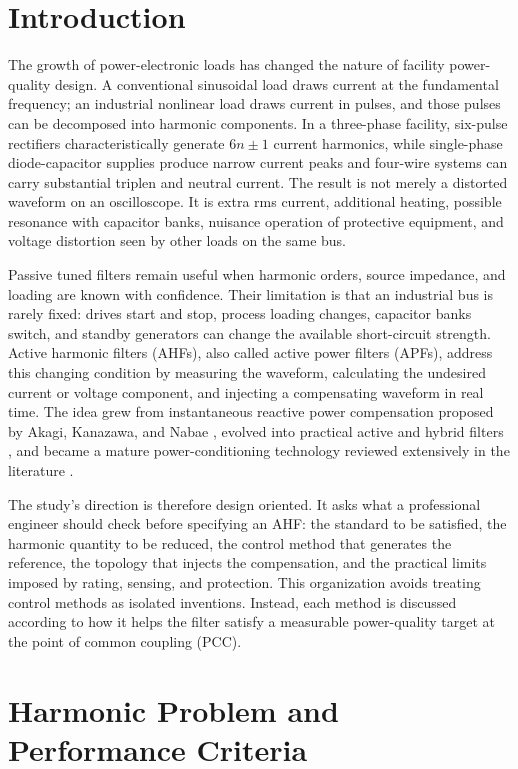 \documentclass[conference]{IEEEtran}
\begin{document}
\section{Introduction}
The growth of power-electronic loads has changed the nature of facility power-quality design. A conventional sinusoidal load draws current at the fundamental frequency; an industrial nonlinear load draws current in pulses, and those pulses can be decomposed into harmonic components. In a three-phase facility, six-pulse rectifiers characteristically generate $6n\pm1$ current harmonics, while single-phase diode-capacitor supplies produce narrow current peaks and four-wire systems can carry substantial triplen and neutral current. The result is not merely a distorted waveform on an oscilloscope. It is extra rms current, additional heating, possible resonance with capacitor banks, nuisance operation of protective equipment, and voltage distortion seen by other loads on the same bus.

Passive tuned filters remain useful when harmonic orders, source impedance, and loading are known with confidence. Their limitation is that an industrial bus is rarely fixed: drives start and stop, process loading changes, capacitor banks switch, and standby generators can change the available short-circuit strength. Active harmonic filters (AHFs), also called active power filters (APFs), address this changing condition by measuring the waveform, calculating the undesired current or voltage component, and injecting a compensating waveform in real time. The idea grew from instantaneous reactive power compensation proposed by Akagi, Kanazawa, and Nabae \cite{Akagi1984}, evolved into practical active and hybrid filters \cite{Peng1990,Akagi1996}, and became a mature power-conditioning technology reviewed extensively in the literature \cite{Singh1999,ElHabrouk2000,Akagi2005}.

The study's direction is therefore design oriented. It asks what a professional engineer should check before specifying an AHF: the standard to be satisfied, the harmonic quantity to be reduced, the control method that generates the reference, the topology that injects the compensation, and the practical limits imposed by rating, sensing, and protection. This organization avoids treating control methods as isolated inventions. Instead, each method is discussed according to how it helps the filter satisfy a measurable power-quality target at the point of common coupling (PCC).

\section{Harmonic Problem and Performance Criteria}
\end{document}
